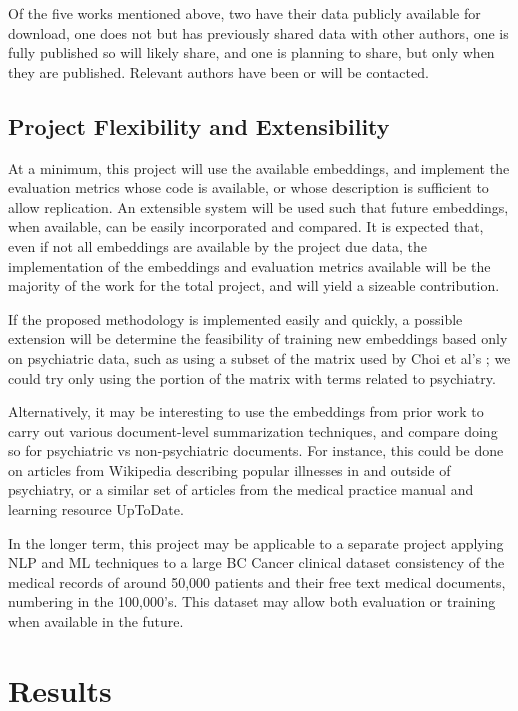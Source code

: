 \documentclass[10pt]{article}
\begin{document}
Of the five works mentioned above, two have their data publicly available for download, one does not but has previously shared data with other authors, one is fully published so will likely share, and one is planning to share, but only when they are published. Relevant authors have been or will be contacted. 

\subsection{Project Flexibility and Extensibility}

At a minimum, this project will use the available embeddings, and implement the evaluation metrics whose code is available, or whose description is sufficient to allow replication. An extensible system will be used such that future embeddings, when available, can be easily incorporated and compared. It is expected that, even if not all embeddings are available by the project due data, the implementation of the embeddings and evaluation metrics available will be the majority of the work for the total project, and will yield a sizeable contribution. 

If the proposed methodology is implemented easily and quickly, a possible extension will be determine the feasibility of training new embeddings based only on psychiatric data, such as using a subset of the matrix used by Choi et al's ; we could try only using the portion of the matrix with terms related to psychiatry. 

Alternatively, it may be interesting to use the embeddings from prior work to carry out various document-level summarization techniques, and compare doing so for psychiatric vs non-psychiatric documents. For instance, this could be done on articles from Wikipedia describing popular illnesses in and outside of psychiatry, or a similar set of articles from the medical practice manual and learning resource UpToDate.

In the longer term, this project may be applicable to a separate project applying NLP and ML techniques to a large BC Cancer clinical dataset consistency of the medical records of around 50,000 patients and their free text medical documents, numbering in the 100,000's. This dataset may allow both evaluation or training when available in the future. 

\section{Results}
\end{document}
